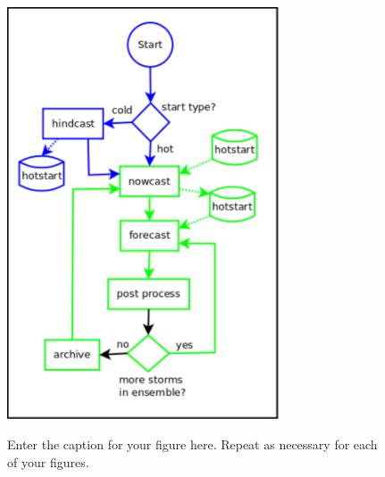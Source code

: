 \documentclass[12pt]{article}
\begin{document}
\begin{figure}[t]
  \noindent\includegraphics[width=19pc,angle=0]{asgs_overview_color.pdf}\\
  \caption{Enter the caption for your figure here.  Repeat as
  necessary for each of your figures.}\label{f1}
\end{figure}
\end{document}

